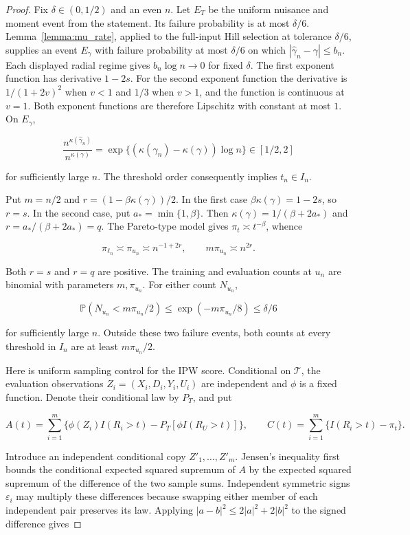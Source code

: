 \documentclass[12pt]{article}
\theoremstyle{plain}
\theoremstyle{definition}
\begin{document}
\begin{proof}
Fix $\delta\in(0,1/2)$ and an even $n$. Let $E_T$ be the uniform nuisance and moment event from the statement. Its failure probability is at most $\delta/6$. Lemma~\ref{lemma:mu_rate}, applied to the full-input Hill selection at tolerance $\delta/6$, supplies an event $E_\gamma$ with failure probability at most $\delta/6$ on which $|\hat\gamma_n-\gamma|\leq b_n$. Each displayed radial regime gives $b_n\log n\to0$ for fixed $\delta$. The first exponent function has derivative $1-2s$. For the second exponent function the derivative is $1/(1+2v)^2$ when $v<1$ and $1/3$ when $v>1$, and the function is continuous at $v=1$. Both exponent functions are therefore Lipschitz with constant at most $1$. On $E_\gamma$,

\[
\frac{n^{\kappa(\hat\gamma_n)}}{n^{\kappa(\gamma)}}=\exp\{(\kappa(\hat\gamma_n)-\kappa(\gamma))\log n\}\in[1/2,2]
\]

for sufficiently large $n$. The threshold order consequently implies $t_n\in I_n$.

Put $m=n/2$ and $r=(1-\beta\kappa(\gamma))/2$. In the first case $\beta\kappa(\gamma)=1-2s$, so $r=s$. In the second case, put $a_*=\min\{1,\beta\}$. Then $\kappa(\gamma)=1/(\beta+2a_*)$ and $r=a_*/(\beta+2a_*)=q$. The Pareto-type model gives $\pi_t\asymp t^{-\beta}$, whence

\[
\pi_{\ell_n}\asymp\pi_{u_n}\asymp n^{-1+2r},\qquad m\pi_{u_n}\asymp n^{2r}.
\]

Both $r=s$ and $r=q$ are positive. The training and evaluation counts at $u_n$ are binomial with parameters $m,\pi_{u_n}$. For either count $N_{u_n}$,

\[
\mathbb P(N_{u_n}<m\pi_{u_n}/2)\leq\exp(-m\pi_{u_n}/8)\leq\delta/6
\]

for sufficiently large $n$. Outside these two failure events, both counts at every threshold in $I_n$ are at least $m\pi_{u_n}/2$.

Here is uniform sampling control for the IPW score. Conditional on $\mathcal T$, the evaluation observations $Z_i=(X_i,D_i,Y_i,U_i)$ are independent and $\phi$ is a fixed function. Denote their conditional law by $P_T$, and put

\[
A(t)=\sum_{i=1}^{m}\{\phi(Z_i)I(R_i>t)-P_T[\phi I(R_U>t)]\},\qquad C(t)=\sum_{i=1}^{m}\{I(R_i>t)-\pi_t\}.
\]

Introduce an independent conditional copy $Z'_1,\ldots,Z'_m$. Jensen's inequality first bounds the conditional expected squared supremum of $A$ by the expected squared supremum of the difference of the two sample sums. Independent symmetric signs $\varepsilon_i$ may multiply these differences because swapping either member of each independent pair preserves its law. Applying $|a-b|^2\leq2|a|^2+2|b|^2$ to the signed difference gives


\end{proof}
\end{document}
